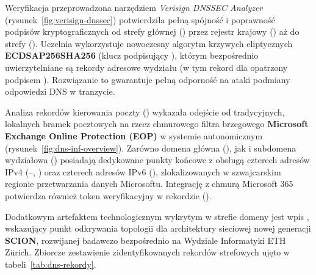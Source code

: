 
Weryfikacja przeprowadzona narzędziem \textit{Verisign DNSSEC Analyzer} (rysunek~\ref{fig:verisign-dnssec}) potwierdziła pełną spójność i poprawność podpisów kryptograficznych od strefy głównej () przez rejestr krajowy  () aż do strefy  (). Uczelnia wykorzystuje nowoczesny algorytm krzywych eliptycznych \textbf{ECDSAP256SHA256} (klucz podpisujący ), którym bezpośrednio uwierzytelniane są rekordy adresowe wydziału (w tym rekord  dla  opatrzony podpisem ). Rozwiązanie to gwarantuje pełną odporność na ataki podmiany odpowiedzi DNS w tranzycie.



Analiza rekordów kierowania poczty () wykazała odejście od tradycyjnych, lokalnych bramek pocztowych na rzecz chmurowego filtra brzegowego \textbf{Microsoft Exchange Online Protection (EOP)} w systemie autonomicznym  (rysunek~\ref{fig:dns-inf-overview}). Zarówno domena główna (), jak i subdomena wydziałowa () posiadają dedykowane punkty końcowe z obsługą czterech adresów IPv4 (--, ) oraz czterech adresów IPv6 (), zlokalizowanych w szwajcarskim regionie przetwarzania danych Microsoftu. Integrację z chmurą Microsoft 365 potwierdza również token weryfikacyjny w rekordzie  ().

Dodatkowym artefaktem technologicznym wykrytym w strefie  domeny  jest wpis , wskazujący punkt odkrywania topologii dla architektury sieciowej nowej generacji \textbf{SCION}, rozwijanej badawczo bezpośrednio na Wydziale Informatyki ETH Zürich. Zbiorcze zestawienie zidentyfikowanych rekordów strefowych ujęto w tabeli~\ref{tab:dns-rekordy}.



